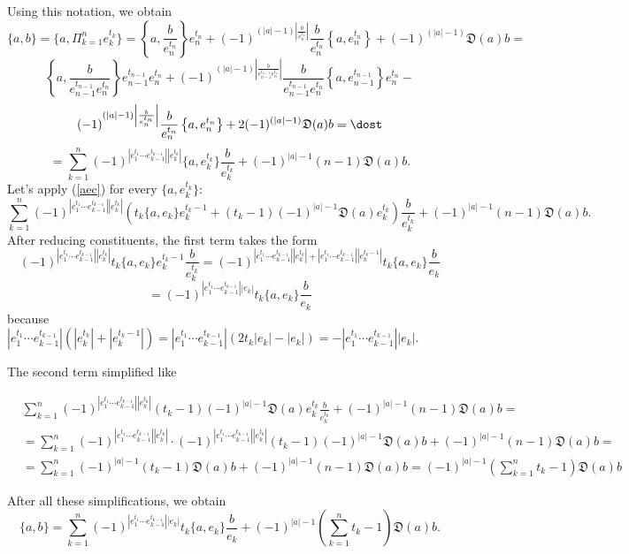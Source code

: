 \documentclass[secthm,seceqn,amsthm,ussrhead,reqno,12pt]{amsart}
\theoremstyle{plain}
\begin{document}
Using this notation,
we obtain
$$
\{a,b\}=\{a, \Pi_{k=1}^n e_k^{t_k} \}=
\left\{a, \frac{b}{e_n^{t_n}} \right\}e_n^{t_n}+(-1)^{(|a|-1)\left|\frac{b}{e_n^{t_n}}\right|} \frac{b}{e_n^{t_n}} \left\{a, e_n^{t_n} \right\} +(-1)^{(|a|-1)}{\mathfrak D}(a)b=
$$
$$
\left\{a, \frac{b}{e_{n-1}^{t_{n-1}}e_n^{t_n}} \right\}e_{n-1}^{t_{n-1}}e_n^{t_n}+
(-1)^{(|a|-1)\left|\frac{b}{e_{n-1}^{t_{n-1}}e_n^{t_n}}\right|} \frac{b}{e_{n-1}^{t_{n-1}}e_n^{t_n}} \left\{a, e_{n-1}^{t_{n-1}} \right\} e_n^{t_n} -
$$
$$
(-1)^{(|a|-1)\left|\frac{b}{e_n^{t_n}}\right|} \frac{b}{e_n^{t_n}} \left\{a, e_n^{t_n} \right\} +2(-1)^{(|a|-1)}{\mathfrak D}(a)b=\dost
$$
$$
=\sum_{k=1}^n
(-1)^{|e_1^{t_1}\cdots e_{k-1}^{t_{k-1}}||e_k^{t_k}|}
\{a, e_k^{t_k}\} \frac{b}{e_k^{t_k}} + (-1)^{|a|-1} (n-1) {\mathfrak D}(a)b.
$$
Let's apply (\ref{aec}) for every $\{a, e_k^{t_k} \}$:
$$
\sum_{k=1}^n
(-1)^{|e_1^{t_1}\cdots e_{k-1}^{t_{k-1}}||e_k^{t_k}|}
\left( t_k\{a, e_k\} e_k^{t_k -1} + (t_k-1)(-1)^{|a|-1}{\mathfrak D}(a)e_k^{t_k} \right)\frac{b}{e_k^{t_k}} + (-1)^{|a|-1} (n-1) {\mathfrak D}(a)b.
$$
After reducing constituents, the first term takes the form
$$(-1)^{|e_1^{t_1}\cdots e_{k-1}^{t_{k-1}}||e_k^{t_k}|}
t_k\{a, e_k\} e_k^{t_k -1}\frac{b}{e_k^{t_k}}=(-1)^{|e_1^{t_1}\cdots e_{k-1}^{t_{k-1}}||e_k^{t_k}|+|e_1^{t_1}\cdots e_{k-1}^{t_{k-1}}||e_k^{t_k-1}|}t_k\{a, e_k\} \frac{b}{e_k}$$
$$=(-1)^{|e_1^{t_1}\cdots e_{k-1}^{t_{k-1}}||e_k|}t_k\{a, e_k\} \frac{b}{e_k}$$
because $|e_1^{t_1}\cdots e_{k-1}^{t_{k-1}}|(|e_k^{t_k}|+|e_k^{t_k-1}|)=|e_1^{t_1}\cdots e_{k-1}^{t_{k-1}}|(2t_k|e_k|-|e_k|)=-|e_1^{t_1}\cdots e_{k-1}^{t_{k-1}}||e_k|$.

The second term simplified like

\begin{equation*}
\begin{aligned}
&\sum_{k=1}^n
(-1)^{|e_1^{t_1}\cdots e_{k-1}^{t_{k-1}}||e^{t_k}_k|}
(t_k-1)(-1)^{|a|-1}{\mathfrak D}(a)e_k^{t_k}\frac{b}{e^{t_{k}}_k} + (-1)^{|a|-1} (n-1) {\mathfrak D}(a)b =\\
&=\sum_{k=1}^n
(-1)^{|e_1^{t_1}\cdots e_{k-1}^{t_{k-1}}||e^{t_k}_k|}\cdot (-1)^{|e_1^{t_1}\cdots e_{k-1}^{t_{k-1}}||e^{t_k}_k|}
(t_k-1)(-1)^{|a|-1}{\mathfrak D}(a)b+(-1)^{|a|-1} (n-1) {\mathfrak D}(a)b=\\
& =\sum_{k=1}^n(-1)^{|a|-1}(t_k-1){\mathfrak D}(a)b+(-1)^{|a|-1} (n-1) {\mathfrak D}(a)b= (-1)^{|a|-1} \left(\sum_{k=1}^n t_k-1\right) {\mathfrak D}(a)b
\end{aligned}
\end{equation*}

After all these simplifications, we obtain 
\begin{equation}
\{a,b\}=\sum_{k=1}^n
(-1)^{|e_1^{t_1}\cdots e_{k-1}^{t_{k-1}}||e_k|}
t_k \{a, e_k\} \frac{b}{e_k} + (-1)^{|a|-1} \left(\sum_{k=1}^n t_k-1\right) {\mathfrak D}(a)b.
\end{equation}
\end{document}
